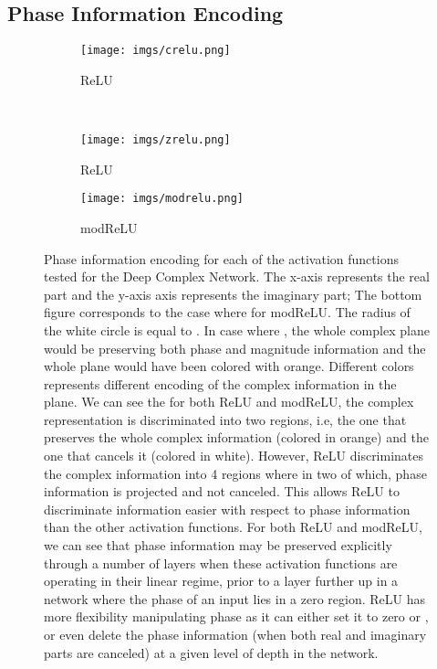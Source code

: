 \documentclass{article}
\begin{document}
\subsection{Phase Information Encoding}\label{phase_encoding}
\begin{figure}[h]
\centering
\begin{subfigure}[t]{0.5\textwidth}
\centering
\texttt{[image: imgs/crelu.png]}
\caption{ReLU}
    \end{subfigure}~ 
    \begin{subfigure}[t]{0.5\textwidth}
    \centering
\texttt{[image: imgs/zrelu.png]}
\caption{ReLU}
 	\end{subfigure}
    \begin{subfigure}[t]{0.5\textwidth}
    \centering
\texttt{[image: imgs/modrelu.png]}
\caption{modReLU}
 \end{subfigure}
	\caption{Phase information encoding for each of the activation functions tested for the Deep Complex Network. The x-axis represents the real part and the y-axis axis represents the imaginary part; The bottom figure corresponds to the case where  for modReLU. The radius of the white circle is equal to . In case where , the whole complex plane would be preserving both phase and magnitude information and the whole plane would have been colored with orange. Different colors represents different encoding of the complex information in the plane. We can see the for both ReLU and modReLU, the complex representation is discriminated into two regions, i.e, the one that preserves the whole complex information (colored in orange) and the one that cancels it (colored in white). However, ReLU discriminates the complex information into 4 regions where in two of which, phase information is projected and not canceled. This allows ReLU to discriminate information easier with respect to phase information than the other activation functions. For both ReLU and modReLU, we can see that phase information may be preserved explicitly through a number of layers when these activation functions are operating in their linear regime, prior to a layer further up in a network where the phase of an input lies in a zero region. ReLU has more flexibility manipulating phase as it can either set it to zero or , or even delete the phase information (when both real and imaginary parts are canceled) at a given level of depth in the network.}
\end{figure}
\end{document}
